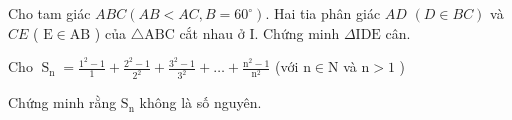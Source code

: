 \begin{bt}
    Cho tam giác $A B C\left(A B<A C, B=60^{\circ}\right)$. Hai tia phân giác $A D$ $(D \in B C)$ và $C E$ ( $\mathrm{E} \in \mathrm{AB}$ ) của $\triangle \mathrm{ABC}$ cắt nhau ở I. Chứng minh $\Delta \mathrm{IDE}$ cân.
\loigiai{}
\end{bt}

\begin{bt}
    Cho $\operatorname{S}_{\mathrm{n}}=\frac{1^2-1}{1}+\frac{2^2-1}{2^2}+\frac{3^2-1}{3^2}+\ldots+\frac{\mathrm{n}^2-1}{\mathrm{n}^2}$ (với $\mathrm{n} \in \mathrm{N}$ và $\mathrm{n}>1$ )
    
    Chứng minh rằng $\mathrm{S}_{\mathrm{n}}$ không là số nguyên.
\end{bt}

